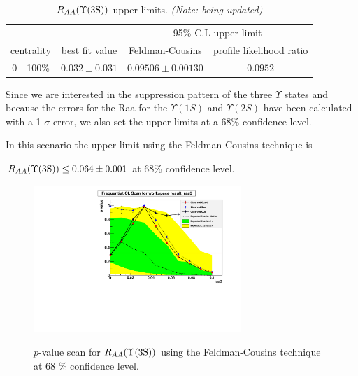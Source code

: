  
\begin{table}[!v]
  \centering
  \caption{$R_{AA}(\Upsilon\mathrm{(3S)})$ upper limits. \emph{(Note: being updated)}}
  \begin{tabular}{c|c|c|c}
    \hline
    & & \multicolumn{2}{c}{95\% C.L upper limit}  \\
    centrality & best fit value & Feldman-Cousins & profile likelihood ratio  \\
    \hline
    0 - 100\% & $ 0.032 \pm  0.031$ &$ 0.09506 \pm 0.00130$ & $0.0952$ \\
    \hline
  \end{tabular}
  \label{tab:Raaupperlimits}
\end{table}

Since we are interested in the suppression pattern of the three $\Upsilon$ states and because the errors for the Raa for the $\Upsilon(1S)$ and $\Upsilon(2S)$ have been calculated with a 1 $\sigma$ error, we also set the upper limits at a 68\% confidence level.

In this scenario the upper limit using the Feldman Cousins technique is 

$R_{AA}(\Upsilon\mathrm{(3S)}) \leq 0.064 \pm 0.001$  at 68\% confidence level.



\begin{figure}[hbtp]
  \begin{center}
\includegraphics[angle=0,width=0.7\textwidth]{figures/limits/FCRaa3S_withsystematics68}\label{fig:/FC_Raa_Limit_MB_68}
   \caption{$p$-value scan for $R_{AA}(\Upsilon\mathrm{(3S)})$ using the Feldman-Cousins technique at 68 \% confidence level.}
   \label{fig:FC_Raa_Limit_MB_68}
 \end{center}
\end{figure}




